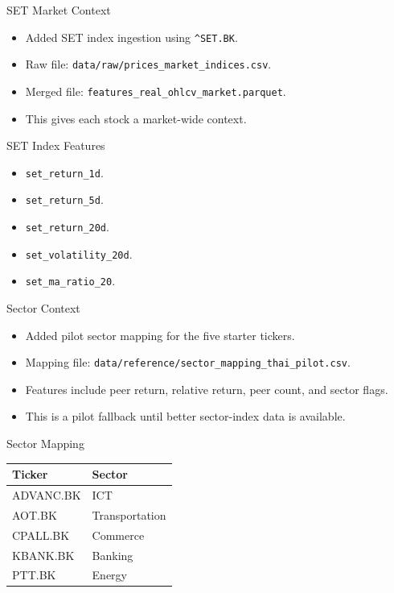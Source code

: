 \documentclass[aspectratio=43,10pt]{beamer}
\begin{document}
\begin{frame}{SET Market Context}
\begin{itemize}
  \item Added SET index ingestion using \texttt{\^{}SET.BK}.
  \item Raw file: \texttt{data/raw/prices\_market\_indices.csv}.
  \item Merged file: \texttt{features\_real\_ohlcv\_market.parquet}.
  \item This gives each stock a market-wide context.
\end{itemize}
\end{frame}

\begin{frame}{SET Index Features}
\begin{itemize}
  \item \texttt{set\_return\_1d}.
  \item \texttt{set\_return\_5d}.
  \item \texttt{set\_return\_20d}.
  \item \texttt{set\_volatility\_20d}.
  \item \texttt{set\_ma\_ratio\_20}.
\end{itemize}
\end{frame}

\begin{frame}{Sector Context}
\begin{itemize}
  \item Added pilot sector mapping for the five starter tickers.
  \item Mapping file: \texttt{data/reference/sector\_mapping\_thai\_pilot.csv}.
  \item Features include peer return, relative return, peer count, and sector flags.
  \item This is a pilot fallback until better sector-index data is available.
\end{itemize}
\end{frame}

\begin{frame}{Sector Mapping}
\begin{center}
\begin{tabular}{ll}
\toprule
Ticker & Sector \\
\midrule
ADVANC.BK & ICT \\
AOT.BK & Transportation \\
CPALL.BK & Commerce \\
KBANK.BK & Banking \\
PTT.BK & Energy \\
\bottomrule
\end{tabular}
\end{center}
\end{frame}
\end{document}
